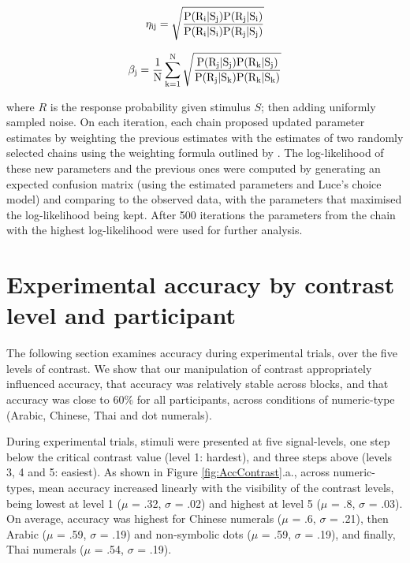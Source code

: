 \begin{equation}
    \rm \eta_{ij} = \sqrt{ \frac{ P(R_i | S_j) P(R_j | S_i) } 
    { P(R_i | S_i) P(R_j | S_j) } }
    \label{Eq:simAppx}
\end{equation}

\begin{equation}
    \rm \beta_{j} = \frac{1}{N} \sum_{k=1}^{N} \sqrt{ \frac{ P(R_j|S_j)P(R_k|S_j) } { P(R_j|S_k)P(R_k|S_k) } }
    \label{Eq:biasAppx}
\end{equation}

\noindent
where $R$ is the response probability given stimulus $S$; then adding uniformly sampled noise. On each iteration, each chain proposed updated parameter estimates by weighting the previous estimates with the estimates of two randomly selected chains using the weighting formula outlined by . The log-likelihood of these new parameters and the previous ones were computed by generating an expected confusion matrix (using the estimated parameters and Luce’s choice model) and comparing to the observed data, with the parameters that maximised the log-likelihood being kept. After 500 iterations the parameters from the chain with the highest log-likelihood were used for further analysis.

\section{Experimental accuracy by contrast level and participant}
\label{Appendix:contrastAcc}

The following section examines accuracy during experimental trials, over the five levels of contrast. We show that our manipulation of contrast appropriately influenced accuracy, that accuracy was relatively stable across blocks, and that accuracy was close to 60\% for all participants, across conditions of numeric-type (Arabic, Chinese, Thai and dot numerals).

During experimental trials, stimuli were presented at five signal-levels, one step below the critical contrast value (level 1: hardest), and three steps above (levels 3, 4 and 5: easiest). As shown in Figure \ref{fig:AccContrast}.a., across numeric-types, mean accuracy increased linearly with the visibility of the contrast levels, being lowest at level 1 ($\mu$ = .32, $\sigma$ = .02) and highest at level 5 ($\mu$ = .8, $\sigma$ = .03). On average, accuracy was highest for Chinese numerals ($\mu$ = .6, $\sigma$ = .21), then Arabic ($\mu$ = .59, $\sigma$ = .19) and non-symbolic dots ($\mu$ = .59, $\sigma$ = .19), and finally, Thai numerals ($\mu$ = .54, $\sigma$ = .19).


